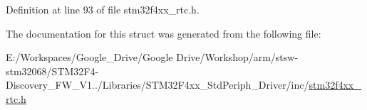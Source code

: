Definition at line 93 of file stm32f4xx\-\_\-rtc.\-h.



The documentation for this struct was generated from the following file\-:\begin{DoxyCompactItemize}
\item 
E\-:/\-Workspaces/\-Google\-\_\-\-Drive/\-Google Drive/\-Workshop/arm/stsw-\/stm32068/\-S\-T\-M32\-F4-\/\-Discovery\-\_\-\-F\-W\-\_\-\-V1../\-Libraries/\-S\-T\-M32\-F4xx\-\_\-\-Std\-Periph\-\_\-\-Driver/inc/\hyperlink{stm32f4xx__rtc_8h}{stm32f4xx\-\_\-rtc.\-h}\end{DoxyCompactItemize}

